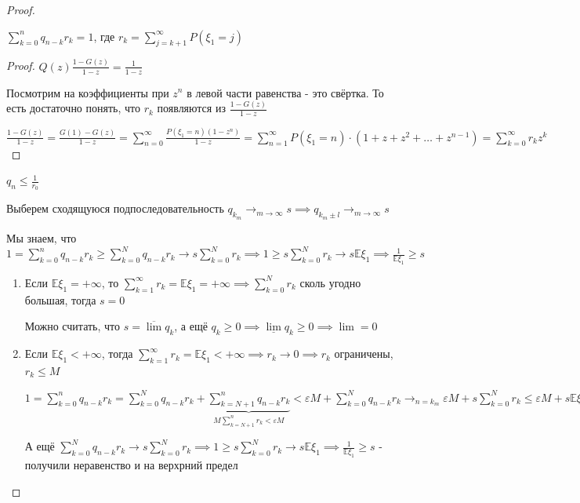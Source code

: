 \begin{proof}
    \begin{lemma}
        $\sum\limits_{k = 0}^n q_{n - k}r_k = 1$, где $r_k = \sum\limits_{j = k + 1}^\infty P(\xi_1 = j)$
    \end{lemma}

    \begin{proof}
        $Q(z) \frac{1 - G(z)}{1 - z} = \frac{1}{1 - z}$

        Посмотрим на коэффициенты при $z^n$ в левой части равенства - это свёртка. То есть достаточно понять, что $r_k$ появляются из $\frac{1 - G(z)}{1 - z}$

        $\frac{1 - G(z)}{1 - z} = \frac{G(1) - G(z)}{1 - z} = \sum\limits_{n = 0}^\infty \frac{P(\xi_1 = n) (1 - z^n)}{1 - z} = \sum\limits_{n = 1}^\infty P(\xi_1 = n) \cdot (1 + z + z^2 + \ldots + z^{n - 1}) = \sum\limits_{k = 0}^\infty r_k z^k$
    \end{proof}

    \begin{consequence}
        $q_n \leqslant \frac{1}{r_0}$
    \end{consequence}

    Выберем сходящуюся подпоследовательность $q_{k_m} \rightarrow_{m \to \infty} s \implies q_{k_{m} \pm l} \rightarrow_{m \to \infty} s$

    Мы знаем, что $1 = \sum\limits_{k = 0}^n q_{n - k}r_k \geqslant \sum\limits_{k = 0}^N q_{n - k}r_k \rightarrow s \sum\limits_{k = 0}^N r_k \implies 1 \geqslant s \sum\limits_{k = 0}^N r_k \rightarrow s \mathbb{E} \xi_1 \implies \frac{1}{\mathbb{E} \xi_1} \geqslant s$

    \begin{enumerate}
        \item {
            Если $\mathbb{E} \xi_1 = +\infty$, то $\sum\limits_{k = 1}^\infty r_k = \mathbb{E} \xi_1 = +\infty \implies \sum\limits_{k = 0}^N r_k$ сколь угодно большая, тогда $s = 0$

            Можно считать, что $s = \overline{\lim} q_k$, а ещё $q_k \geqslant 0 \implies \underline{\lim} q_k \geqslant 0 \implies \lim = 0$
        }
        \item {
            Если $\mathbb{E} \xi_1 < +\infty$, тогда $\sum\limits_{k = 1}^\infty r_k = \mathbb{E} \xi_1 < +\infty \implies r_k \rightarrow 0 \implies r_k$ ограничены, $r_k \leqslant M$

            $1 = \sum\limits_{k = 0}^n q_{n - k} r_k = \sum\limits_{k = 0}^N q_{n - k} r_k + \underbrace{\sum\limits_{k = N + 1}^n q_{n - k}r_k}_{M \sum\limits_{k = N + 1}^n r_k < \varepsilon M} < \varepsilon M + \sum\limits_{k = 0}^N q_{n - k}r_k 
            \rightarrow_{n = k_m} \varepsilon M + s\sum\limits_{k = 0}^N r_k \leqslant \varepsilon M + s\mathbb{E} \xi_1 \implies 1 \leqslant s \mathbb{E} \xi_1 \implies \underline{\lim} \geqslant \frac{1}{\mathbb{E} \xi_1}$ 

            А ещё $\sum\limits_{k = 0}^N q_{n - k}r_k \rightarrow s \sum\limits_{k = 0}^N r_k \implies 1 \geqslant s \sum\limits_{k = 0}^N r_k \rightarrow s \mathbb{E} \xi_1 \implies \frac{1}{\mathbb{E} \xi_1} \geqslant s$ - получили неравенство и на верхрний предел
        }
    \end{enumerate}
\end{proof}

